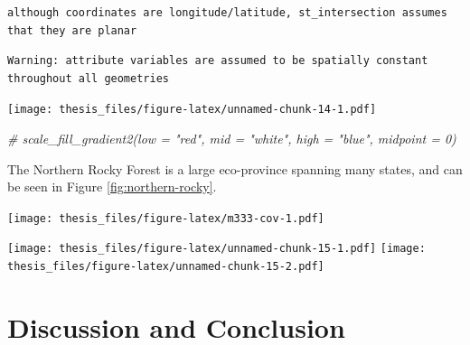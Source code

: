 \documentclass[12pt,twoside]{reedthesis}
\newenvironment{Shaded}{\begin{snugshade}}{\end{snugshade}}
\newcommand{\CommentTok}[1]{\textcolor[rgb]{0.56,0.35,0.01}{\textit{#1}}}
\newcommand{\DataTypeTok}[1]{\textcolor[rgb]{0.13,0.29,0.53}{#1}}
\newcommand{\KeywordTok}[1]{\textcolor[rgb]{0.13,0.29,0.53}{\textbf{#1}}}
\newcommand{\NormalTok}[1]{#1}
\newcommand{\OperatorTok}[1]{\textcolor[rgb]{0.81,0.36,0.00}{\textbf{#1}}}
\newcommand{\StringTok}[1]{\textcolor[rgb]{0.31,0.60,0.02}{#1}}
\begin{document}
\begin{verbatim}
although coordinates are longitude/latitude, st_intersection assumes that they are planar
\end{verbatim}
\begin{verbatim}
Warning: attribute variables are assumed to be spatially constant
throughout all geometries
\end{verbatim}
\begin{Shaded}
\end{Shaded}
\texttt{[image: thesis\_files/figure-latex/unnamed-chunk-14-1.pdf]}
\begin{Shaded}
\begin{Highlighting}[]
  \CommentTok{# scale_fill_gradient2(low = "red", mid = "white", high = "blue", midpoint = 0)}
\end{Highlighting}
\end{Shaded}
The Northern Rocky Forest is a large eco-province spanning many states, and can be seen in Figure \ref{fig:northern-rocky}.

\texttt{[image: thesis\_files/figure-latex/m333-cov-1.pdf]}

\texttt{[image: thesis\_files/figure-latex/unnamed-chunk-15-1.pdf]} \texttt{[image: thesis\_files/figure-latex/unnamed-chunk-15-2.pdf]}

\hypertarget{discussion-and-conclusion}{%
\chapter{Discussion and Conclusion}\label{discussion-and-conclusion}}
\end{document}
